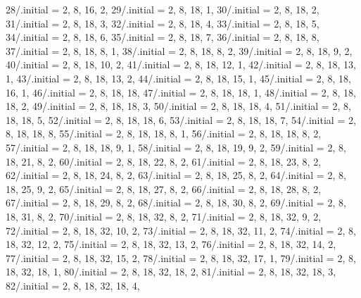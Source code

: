 {    28/.initial = {2, 8, 16, 2},  %
    29/.initial = {2, 8, 18, 1},  %
    30/.initial = {2, 8, 18, 2},  %
    31/.initial = {2, 8, 18, 3},  %
    32/.initial = {2, 8, 18, 4},  %
    33/.initial = {2, 8, 18, 5},  %
    34/.initial = {2, 8, 18, 6},  %
    35/.initial = {2, 8, 18, 7},  %
    36/.initial = {2, 8, 18, 8},  %
    37/.initial = {2, 8, 18,  8, 1},  %
    38/.initial = {2, 8, 18,  8, 2},  %
    39/.initial = {2, 8, 18,  9, 2},  %
    40/.initial = {2, 8, 18, 10, 2},  %
    41/.initial = {2, 8, 18, 12, 1},  %
    42/.initial = {2, 8, 18, 13, 1},  %
    43/.initial = {2, 8, 18, 13, 2},  %
    44/.initial = {2, 8, 18, 15, 1},  %
    45/.initial = {2, 8, 18, 16, 1},  %
    46/.initial = {2, 8, 18, 18},     %
    47/.initial = {2, 8, 18, 18, 1},  %
    48/.initial = {2, 8, 18, 18, 2},  %
    49/.initial = {2, 8, 18, 18, 3},  %
    50/.initial = {2, 8, 18, 18, 4},  %
    51/.initial = {2, 8, 18, 18, 5},  %
    52/.initial = {2, 8, 18, 18, 6},  %
    53/.initial = {2, 8, 18, 18, 7},  %
    54/.initial = {2, 8, 18, 18, 8},  %
    55/.initial = {2, 8, 18, 18,  8, 1},  %
    56/.initial = {2, 8, 18, 18,  8, 2},  %
    57/.initial = {2, 8, 18, 18,  9, 1},  %
    58/.initial = {2, 8, 18, 19,  9, 2},  %
    59/.initial = {2, 8, 18, 21,  8, 2},  %
    60/.initial = {2, 8, 18, 22,  8, 2},  %
    61/.initial = {2, 8, 18, 23,  8, 2},  %
    62/.initial = {2, 8, 18, 24,  8, 2},  %
    63/.initial = {2, 8, 18, 25,  8, 2},  %
    64/.initial = {2, 8, 18, 25,  9, 2},  %
    65/.initial = {2, 8, 18, 27,  8, 2},  %
    66/.initial = {2, 8, 18, 28,  8, 2},  %
    67/.initial = {2, 8, 18, 29,  8, 2},  %
    68/.initial = {2, 8, 18, 30,  8, 2},  %
    69/.initial = {2, 8, 18, 31,  8, 2},  %
    70/.initial = {2, 8, 18, 32,  8, 2},  %
    71/.initial = {2, 8, 18, 32,  9, 2},  %
    72/.initial = {2, 8, 18, 32, 10, 2},  %
    73/.initial = {2, 8, 18, 32, 11, 2},  %
    74/.initial = {2, 8, 18, 32, 12, 2},  %
    75/.initial = {2, 8, 18, 32, 13, 2},  %
    76/.initial = {2, 8, 18, 32, 14, 2},  %
    77/.initial = {2, 8, 18, 32, 15, 2},  %
    78/.initial = {2, 8, 18, 32, 17, 1},  %
    79/.initial = {2, 8, 18, 32, 18, 1},  %
    80/.initial = {2, 8, 18, 32, 18, 2},  %
    81/.initial = {2, 8, 18, 32, 18, 3},  %
    82/.initial = {2, 8, 18, 32, 18, 4},  %
}
